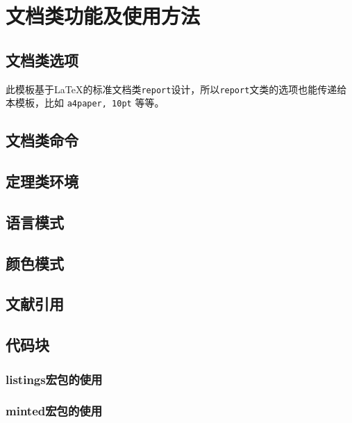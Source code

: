 \documentclass[12pt, green, textbook]{uglyrep}
\begin{document}
\chapter{文档类功能及使用方法}
\section{文档类选项}\label{ssec:classoptions}

此模板基于\LaTeX{}的标准文档类\texttt{report}设计，所以\texttt{report}文类的选项也能传递给本模板，比如 \texttt{a4paper, 10pt} 等等。



\section{文档类命令}


\section{定理类环境}


\section{语言模式}


\section{颜色模式}\label{ssec:colors}


\section{文献引用}


\section{代码块}


\subsection{listings宏包的使用}

\subsection{minted宏包的使用}

\end{document}
